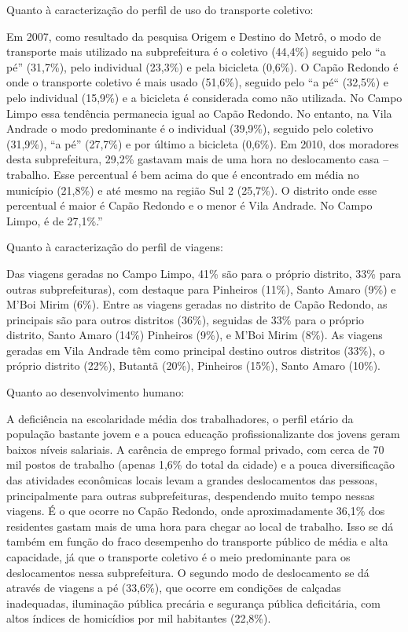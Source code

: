 	Quanto à caracterização do perfil de uso do transporte coletivo:
	\begin{citacao}
		Em 2007, como resultado da pesquisa Origem e Destino do Metrô, o modo de transporte mais utilizado na subprefeitura é o coletivo (44,4\%) seguido pelo “a pé” (31,7\%), pelo individual (23,3\%) e pela bicicleta (0,6\%). O Capão Redondo é onde o transporte coletivo é mais usado (51,6\%), seguido pelo “a pé“ (32,5\%) e pelo individual (15,9\%) e a bicicleta é considerada como não utilizada. No Campo Limpo essa tendência permanecia igual ao Capão Redondo. No entanto, na Vila Andrade o modo predominante é o individual (39,9\%), seguido pelo coletivo (31,9\%), “a pé” (27,7\%) e por último a bicicleta (0,6\%). Em 2010, dos moradores desta subprefeitura, 29,2\% gastavam mais de uma hora no deslocamento casa – trabalho. Esse percentual é bem acima do que é encontrado em média no município (21,8\%) e até mesmo na região Sul 2 (25,7\%). O distrito onde esse percentual é maior é Capão Redondo e o menor é Vila Andrade. No Campo Limpo, é de 27,1\%.” \cite[pág. 66]{planosul2}
	\end{citacao}
	
	Quanto à caracterização do perfil de viagens:
	\begin{citacao}
		Das viagens geradas no Campo Limpo, 41\% são para o próprio distrito, 33\% para outras subprefeituras), com destaque para Pinheiros (11\%), Santo Amaro (9\%) e M’Boi Mirim (6\%). Entre as viagens geradas no distrito de Capão Redondo, as principais são para outros distritos (36\%), seguidas de 33\% para o próprio distrito, Santo Amaro (14\%) Pinheiros (9\%), e M’Boi Mirim (8\%). As viagens geradas em Vila Andrade têm como principal destino  outros distritos (33\%), o próprio distrito (22\%), Butantã (20\%), Pinheiros (15\%), Santo Amaro (10\%). \cite[pág. 67]{planosul2}
	\end{citacao}
	
	Quanto ao desenvolvimento humano:
	
	\begin{citacao}
		A deficiência na escolaridade média dos trabalhadores, o perfil etário da população bastante jovem e a pouca educação profissionalizante dos jovens geram baixos níveis salariais. A carência de emprego formal privado, com cerca de 70 mil postos de trabalho (apenas 1,6\% do total da cidade) e a pouca diversificação das atividades econômicas locais levam a grandes deslocamentos das pessoas, principalmente para outras subprefeituras, despendendo muito tempo nessas viagens. É o que ocorre no Capão Redondo, onde aproximadamente 36,1\% dos residentes gastam mais de uma hora para chegar ao local de trabalho. Isso se dá também em função do fraco desempenho do transporte público de média e alta capacidade, já que o transporte coletivo é o meio predominante para os deslocamentos nessa subprefeitura. O segundo modo de deslocamento se dá através de viagens a pé (33,6\%), que ocorre em condições de calçadas inadequadas, iluminação pública precária e segurança pública deficitária, com altos índices de homicídios por mil habitantes (22,8\%). \cite[pág. 68]{planosul2}
	\end{citacao}
	
